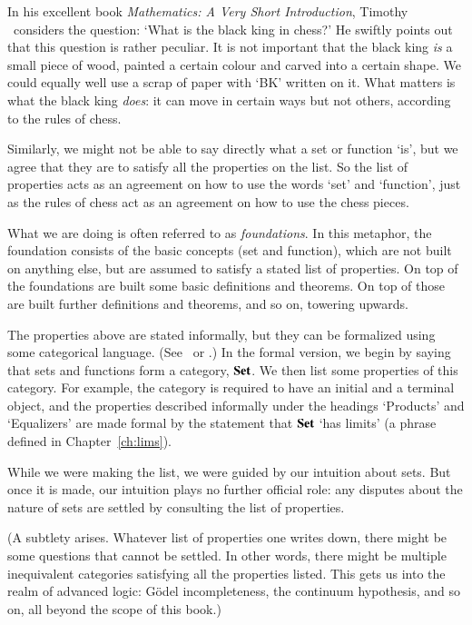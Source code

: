 In his excellent book \emph{Mathematics: A Very Short Introduction},
Timothy \citeGow\ considers the question: `What is the black%
%
%
king in chess?'%
%
%
He swiftly points out that this question is rather peculiar.  It is not
important that the black king \emph{is} a small piece of wood, painted a
certain colour and carved into a certain shape.  We could equally well use
a scrap of paper with `BK' written on it.  What matters is what the black
king \emph{does}: it can move in certain ways but not others, according to
the rules of chess.

Similarly, we might not be able to say directly what a set or function
`is', but we agree that they are to satisfy all the properties on the list.
So the list of properties acts as an agreement on how to use the words
`set' and `function', just as the rules of chess act as an agreement on how
to use the chess pieces.

What we are doing is often referred to as \emph{foundations}.  In this
metaphor, the foundation consists of the basic concepts (set and function),
which are not built on anything else, but are assumed to satisfy a stated
list of properties.  On top of the foundations are built some basic
definitions and theorems.  On top of those are built further definitions
and theorems, and so on, towering upwards.

The properties above are stated informally, but they can be formalized
using some categorical language.  (See \citeLR\ or \citeRST.)  In the
formal version, we begin by saying that sets and functions form a category,
$\mathbf{Set}$.  We then list some properties of this category.  For example, the
category is required to have an initial and a terminal object, and the
properties described informally under the headings `Products' and
`Equalizers' are made formal by the statement that $\mathbf{Set}$ `has limits' (a
phrase defined in Chapter~\ref{ch:lims}).

While we were making the list, we were guided by our intuition about sets.
But once it is made, our intuition plays no further official role: any
disputes about the nature of sets are settled by consulting the list of
properties.

(A subtlety arises.  Whatever list of properties one writes down, there
might be some questions that cannot be settled.  In other words, there
might be multiple inequivalent categories satisfying all the properties
listed.  This gets us into the realm of advanced logic: G\"odel
incompleteness, the continuum hypothesis, and so on, all beyond the scope
of this book.)

